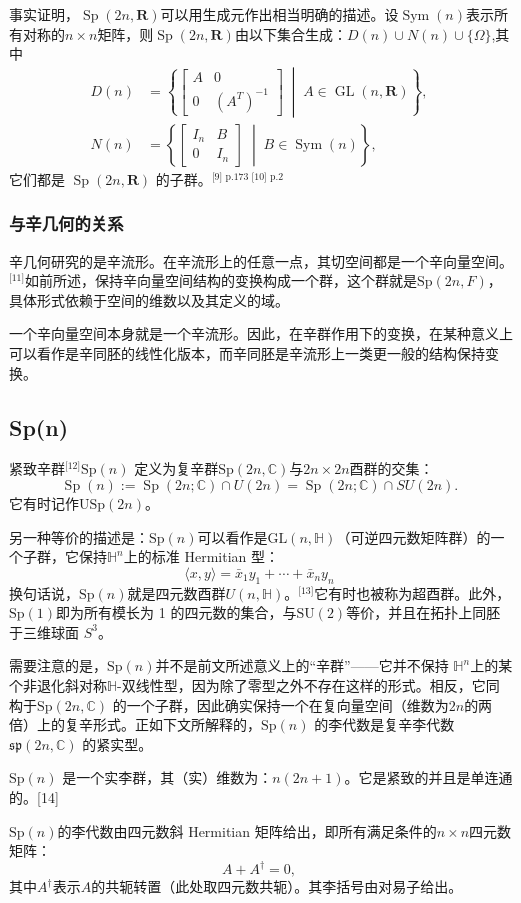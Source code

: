 事实证明，$\operatorname{Sp}(2n, \mathbf{R})$可以用生成元作出相当明确的描述。设$\operatorname{Sym}(n)$表示所有对称的$n \times n$矩阵，则$\operatorname{Sp}(2n, \mathbf{R})$由以下集合生成：$D(n) \cup N(n) \cup \{\Omega\}$,其中
$$
\begin{aligned}
D(n) &= \left\{ 
\begin{bmatrix}
A & 0 \\
0 & (A^{T})^{-1}
\end{bmatrix}
\;\middle|\; A \in \operatorname{GL}(n, \mathbf{R})
\right\},\\
N(n) &= \left\{
\begin{bmatrix}
I_{n} & B \\
0 & I_{n}
\end{bmatrix}
\;\middle|\; B \in \operatorname{Sym}(n)
\right\},
\end{aligned}~
$$
它们都是 $\operatorname{Sp}(2n, \mathbf{R})$ 的子群。\(^\text{[9] p.173 [10] p.2}\)
\subsubsection{与辛几何的关系}
辛几何研究的是辛流形。在辛流形上的任意一点，其切空间都是一个辛向量空间。\(^\text{[11]}\)如前所述，保持辛向量空间结构的变换构成一个群，这个群就是$\mathrm{Sp}(2n, F)$，具体形式依赖于空间的维数以及其定义的域。

一个辛向量空间本身就是一个辛流形。因此，在辛群作用下的变换，在某种意义上可以看作是辛同胚的线性化版本，而辛同胚是辛流形上一类更一般的结构保持变换。
\subsection{Sp(n)}
紧致辛群\(^\text{[12]}\)$\mathrm{Sp}(n)$ 定义为复辛群$\mathrm{Sp}(2n, \mathbb{C})$与$2n \times 2n$酉群的交集：
$$
\operatorname{Sp}(n) := \operatorname{Sp}(2n;\mathbb{C}) \cap U(2n) 
= \operatorname{Sp}(2n;\mathbb{C}) \cap SU(2n).~
$$
它有时记作$\mathrm{USp}(2n)$。

另一种等价的描述是：$\mathrm{Sp}(n)$可以看作是$\mathrm{GL}(n, \mathbb{H})$（可逆四元数矩阵群）的一个子群，它保持$\mathbb{H}^n$上的标准 Hermitian 型：
$$
\langle x, y \rangle = \bar{x}_1 y_1 + \cdots + \bar{x}_n y_n~
$$
换句话说，$\mathrm{Sp}(n)$就是四元数酉群$U(n, \mathbb{H})$。\(^\text{[13]}\)它有时也被称为超酉群。此外，$\mathrm{Sp}(1)$即为所有模长为 1 的四元数的集合，与$\mathrm{SU}(2)$等价，并且在拓扑上同胚于三维球面 $S^3$。

需要注意的是，$\mathrm{Sp}(n)$并不是前文所述意义上的“辛群”——它并不保持 $\mathbb{H}^n$上的某个非退化斜对称$\mathbb{H}$-双线性型，因为除了零型之外不存在这样的形式。相反，它同构于$\mathrm{Sp}(2n, \mathbb{C})$ 的一个子群，因此确实保持一个在复向量空间（维数为$2n$的两倍）上的复辛形式。正如下文所解释的，$\mathrm{Sp}(n)$ 的李代数是复辛李代数 $\mathfrak{sp}(2n, \mathbb{C})$ 的紧实型。

$\mathrm{Sp}(n)$ 是一个实李群，其（实）维数为：$n(2n+1)$。它是紧致的并且是单连通的。[14]

$\mathrm{Sp}(n)$的李代数由四元数斜 Hermitian 矩阵给出，即所有满足条件的$n \times n$四元数矩阵：
$$
A + A^{\dagger} = 0,~
$$
其中$A^{\dagger}$表示$A$的共轭转置（此处取四元数共轭）。其李括号由对易子给出。
